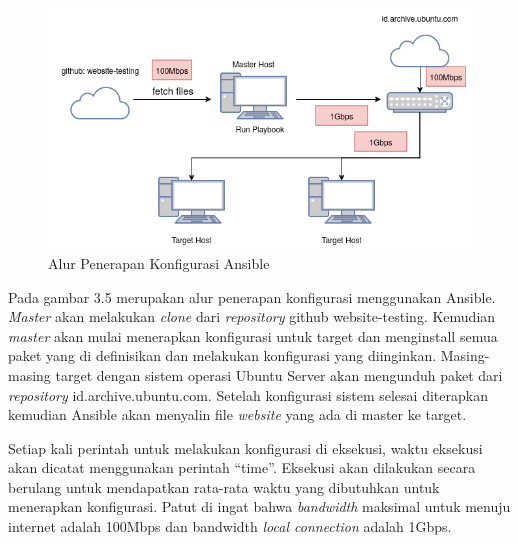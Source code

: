 \documentclass[10pt,]{report}
\begin{document}
\begin{adjustwidth}{20pt}{}
	\begin{figure}[H]
		\centering
		\includegraphics[width=\textwidth]{images/ansible-topology-revision.png}
		\caption{Alur Penerapan Konfigurasi Ansible}
	\end{figure}
	Pada gambar 3.5 merupakan alur penerapan konfigurasi menggunakan Ansible.
	\textit{Master} akan melakukan \textit{clone} dari \textit{repository} github
	website-testing. Kemudian \textit{master} akan mulai menerapkan konfigurasi
	untuk target dan menginstall semua paket yang di definisikan dan melakukan
	konfigurasi yang diinginkan. Masing-masing target dengan sistem operasi
	Ubuntu Server akan mengunduh paket dari \textit{repository}
	id.archive.ubuntu.com.
	Setelah konfigurasi sistem selesai diterapkan kemudian Ansible akan menyalin
	file \textit{website} yang ada di master ke target.

	Setiap kali perintah untuk melakukan konfigurasi di eksekusi, waktu eksekusi
	akan dicatat menggunakan perintah “time”. Eksekusi akan dilakukan secara
	berulang untuk mendapatkan rata-rata waktu yang dibutuhkan untuk menerapkan
	konfigurasi.
	Patut di ingat bahwa \textit{bandwidth} maksimal untuk menuju internet
	adalah 100Mbps dan bandwidth \textit{local connection} adalah 1Gbps.
\end{adjustwidth}
\end{document}
